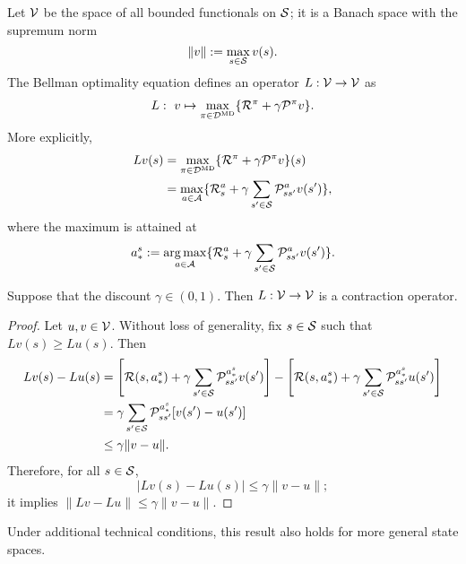 \medspace

Let $\mathcal{V}$ be the space of all bounded functionals on $\mathcal{S}$; it is a Banach space with the supremum norm 
$$\| v \| := \max_{s \in \mathcal{S} } v(s).$$
The Bellman optimality equation defines an operator $L: \mathcal{V} \to \mathcal{V}$ as 
\begin{align*}
L:\ v  \mapsto \max_{\pi \in \mathcal{D}^{\text{MD}}} \{  \mathcal{R}^\pi  + \gamma \mathcal{P}^\pi v \}. 
\end{align*}
More explicitly,
\begin{align*}
Lv(s) &= \max_{\pi \in \mathcal{D}^{\text{MD}}} \{  \mathcal{R}^\pi  + \gamma \mathcal{P}^\pi v  \}(s) \\
&= \max_{a \in \mathcal{A}}  \{  \mathcal{R}^a_s + \gamma \sum_{s'\in\mathcal{S}} \mathcal{P}^a_{ss'} v(s') \},
\end{align*}
where the maximum is attained at 
\begin{align*}
a_\ast^s := \operatorname*{arg\,max}_{a \in \mathcal{A}}  \{  \mathcal{R}^a_s + \gamma \sum_{s'\in\mathcal{S}} \mathcal{P}^a_{ss'} v(s') \}.
\end{align*}

\begin{lemma}
\label{contraction}
Suppose that the discount $\gamma\in (0,1)$. Then $L:\mathcal{V} \to \mathcal{V}$ is a contraction operator.
\end{lemma}
\begin{proof}
Let $u,v \in \mathcal{V}$. Without loss of generality, fix $s\in \mathcal{S}$ such that $Lv(s) \geq Lu(s)$. Then
\begin{align*}
Lv(s) - Lu(s) &= \left[\mathcal{R}(s, a^s_\ast ) + \gamma \sum_{s'\in\mathcal{S}} \mathcal{P}^{a^s_\ast }_{ss'} v(s')\right] - \left[\mathcal{R}(s, a^s_\ast ) + \gamma \sum_{s'\in\mathcal{S}} \mathcal{P}^{a^s_\ast }_{ss'} u(s')\right] \\
&= \gamma \sum_{s'\in\mathcal{S}} \mathcal{P}^{a^s_\ast }_{ss'} [v(s') - u(s')] \\
&\leq \gamma \| v - u\|.
\end{align*}
Therefore, for all $s \in \mathcal{S}$,
$$| Lv(s) - Lu(s) | \leq \gamma \| v - u \|;$$
it implies $\| Lv - Lu\| \leq \gamma \| v- u\|$.
\end{proof}
\begin{remark}
Under additional technical conditions, this result also holds for more general state spaces.
\end{remark}
  
\medspace


